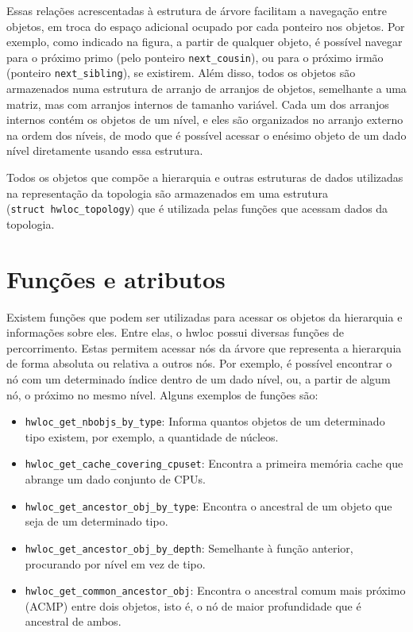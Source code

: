 Essas relações acrescentadas à estrutura de árvore facilitam a navegação entre objetos, em troca do espaço adicional ocupado por cada ponteiro nos objetos.
Por exemplo, como indicado na figura, a partir de qualquer objeto, é possível navegar para o próximo primo (pelo ponteiro \texttt{next\_cousin}), ou para o próximo irmão (ponteiro \texttt{next\_sibling}), se existirem.
Além disso, todos os objetos são armazenados numa estrutura de arranjo de arranjos de objetos, semelhante a uma matriz, mas com arranjos internos de tamanho variável.
Cada um dos arranjos internos contém os objetos de um nível, e eles são organizados no arranjo externo na ordem dos níveis, de modo que é possível acessar o enésimo objeto de um dado nível diretamente usando essa estrutura.

Todos os objetos que compõe a hierarquia e outras estruturas de dados utilizadas na representação da topologia são armazenados em uma estrutura (\texttt{struct~hwloc\_topology}) que é utilizada pelas funções que acessam dados da topologia.


\section{Funções e atributos}

Existem funções que podem ser utilizadas para acessar os objetos da hierarquia e informações sobre eles.
Entre elas, o hwloc possui diversas funções de percorrimento.
Estas permitem acessar nós da árvore que representa a hierarquia de forma absoluta ou relativa a outros nós.
Por exemplo, é possível encontrar o nó com um determinado índice dentro de um dado nível,
ou, a partir de algum nó, o próximo no mesmo nível.
Alguns exemplos de funções são:
\begin{itemize}
	\item \texttt{hwloc\_get\_nbobjs\_by\_type}: Informa quantos objetos de um determinado tipo existem, por exemplo, a quantidade de núcleos.
	\item \texttt{hwloc\_get\_cache\_covering\_cpuset}: Encontra a primeira memória cache que abrange um dado conjunto de CPUs.
	\item \texttt{hwloc\_get\_ancestor\_obj\_by\_type}: Encontra o ancestral de um objeto que seja de um determinado tipo.
	\item \texttt{\texttt{hwloc\_get\_ancestor\_obj\_by\_depth}}: Semelhante à função anterior, procurando por nível em vez de tipo.
	\item \texttt{hwloc\_get\_common\_ancestor\_obj}: Encontra o ancestral comum mais próximo (ACMP) entre dois objetos, isto é, o nó de maior profundidade que é ancestral de ambos.
\end{itemize}

